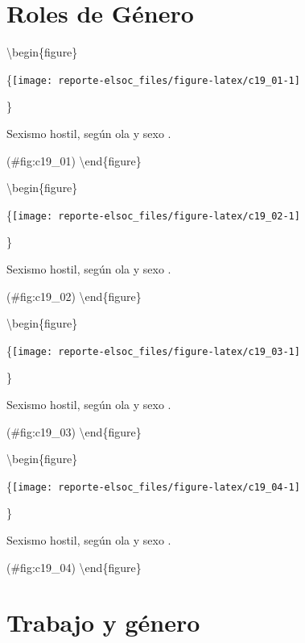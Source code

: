\documentclass[
  12pt,
  openany]{book}
\begin{document}
\hypertarget{roles-de-guxe9nero}{%
\section{Roles de Género}\label{roles-de-guxe9nero}}

\textbackslash begin\{figure\}

\{\centering \texttt{[image: reporte-elsoc\_files/figure-latex/c19\_01-1]}

\}

\caption{Sexismo hostil, según ola y sexo .}

(\#fig:c19\_01)
\textbackslash end\{figure\}

\textbackslash begin\{figure\}

\{\centering \texttt{[image: reporte-elsoc\_files/figure-latex/c19\_02-1]}

\}

\caption{Sexismo hostil, según ola y sexo .}

(\#fig:c19\_02)
\textbackslash end\{figure\}

\textbackslash begin\{figure\}

\{\centering \texttt{[image: reporte-elsoc\_files/figure-latex/c19\_03-1]}

\}

\caption{Sexismo hostil, según ola y sexo .}

(\#fig:c19\_03)
\textbackslash end\{figure\}

\textbackslash begin\{figure\}

\{\centering \texttt{[image: reporte-elsoc\_files/figure-latex/c19\_04-1]}

\}

\caption{Sexismo hostil, según ola y sexo .}

(\#fig:c19\_04)
\textbackslash end\{figure\}

\hypertarget{trabajo-y-guxe9nero}{%
\section{Trabajo y género}\label{trabajo-y-guxe9nero}}
\end{document}
